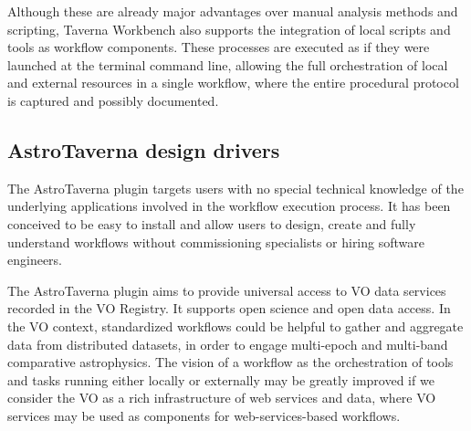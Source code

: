 \documentclass{aa}
\begin{document}
Although these are already major advantages over manual analysis methods and scripting, Taverna Workbench also supports the integration of local scripts and tools as workflow components. These processes are executed as if they were launched at the terminal command line, allowing the full orchestration of local and external resources in a single workflow, where the entire procedural protocol is captured and possibly documented. 


\subsection{AstroTaverna design drivers}
\label{Drivers}

The AstroTaverna plugin targets users with no special technical knowledge of the underlying applications involved in the workflow execution process. It has been conceived to be easy to install and allow users to design, create and fully understand workflows without commissioning specialists or hiring software engineers. 

The AstroTaverna plugin aims to provide universal access to VO data services recorded in the VO Registry. It supports open science and open data access. In the VO context, standardized workflows could be helpful to gather and aggregate data from distributed datasets, in order to engage multi-epoch and multi-band comparative astrophysics. The vision of a workflow as the orchestration of tools and tasks running either locally or externally may be greatly improved if we consider the VO as a rich infrastructure of web services and data, where VO services may be used as components for web-services-based workflows. 
\end{document}
